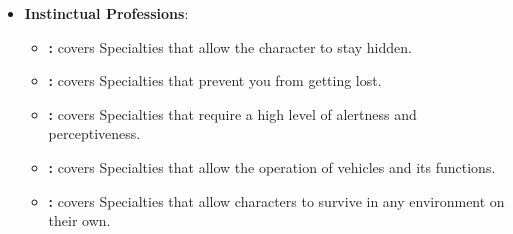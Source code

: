 \begin{itemize}
	\item \textbf{Instinctual Professions}:
	\begin{itemize}
		\item \textbf{:} covers Specialties that allow the character to stay hidden.
		\item \textbf{:} covers Specialties that prevent you from getting lost.
		\item \textbf{:} covers Specialties that require a high level of alertness and perceptiveness.
		\item \textbf{:} covers Specialties that allow the operation of vehicles and its functions.
		\item \textbf{:} covers Specialties that allow characters to survive in any environment on their own.
	\end{itemize}
\end{itemize}

